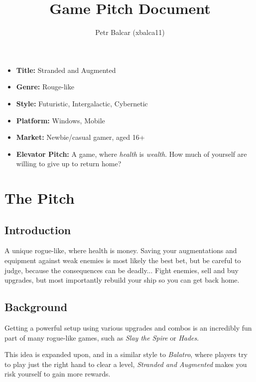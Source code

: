 \documentclass[a4paper,10pt,english]{article}
\title{%
Game Pitch Document%
}
\author{%
Petr Balcar (xbalca11)%
}
\date{}
\begin{document}
\maketitle
\thispagestyle{empty}

{%
\large

\begin{itemize}

\item[] \textbf{Title:} Stranded and Augmented

\item[] \textbf{Genre:} Rouge-like

\item[] \textbf{Style:} Futuristic, Intergalactic, Cybernetic

\item[] \textbf{Platform:} Windows, Mobile

\item[] \textbf{Market:} Newbie/casual gamer, aged 16+

\item[] \textbf{Elevator Pitch:} A game, where \emph{health} is \emph{wealth}. How much of yourself are willing to give up to return home?

\end{itemize}

}

\section*{\centering The Pitch}

\subsection*{Introduction}
A unique rogue-like, where health is money. Saving your augmentations and equipment against weak enemies is most likely the best bet, but be careful to judge, because the consequences can be deadly...
Fight enemies, sell and buy upgrades, but most importantly rebuild your ship so you can get back home.

\subsection*{Background}
Getting a powerful setup using various upgrades and combos is an incredibly fun part of many rogue-like games, such as \emph{Slay the Spire} or \emph{Hades}. 

This idea is expanded upon, and in a similar style to \emph{Balatro}, where players try to play just the right hand to clear a level, \emph{Stranded and Augmented} makes you risk yourself to gain more rewards.
\end{document}
